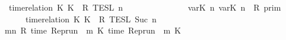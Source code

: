 \begin{isabellebody}
\ \ {\isacartoucheopen}{\isasymlbrakk}\ time{\isacharminus}relation\ {\isasymlfloor}K\ K\ {\isasymin}\ R\ {\isasymrbrakk}\isactrlsub T\isactrlsub E\isactrlsub S\isactrlsub L\isactrlbsup {\isasymge}\ n\isactrlesup \ {\isacharequal}\ \ \ \ \ \ \ \ %
\isanewline
\ \ \ \ \ {\isasymlbrakk}\ {\isasymlfloor}{\isasymtau}\isactrlsub v\isactrlsub a\isactrlsub r{\isacharparenleft}K\ n{\isacharparenright}{\isacharcomma}\ {\isasymtau}\isactrlsub v\isactrlsub a\isactrlsub r{\isacharparenleft}K\ n{\isacharparenright}{\isasymrfloor}\ {\isasymin}\ R\ {\isasymrbrakk}\isactrlsub p\isactrlsub r\isactrlsub i\isactrlsub m\isanewline
\ \ \ \ \ {\isasyminter}\ {\isasymlbrakk}\ time{\isacharminus}relation\ {\isasymlfloor}K\ K\ {\isasymin}\ R\ {\isasymrbrakk}\isactrlsub T\isactrlsub E\isactrlsub S\isactrlsub L\isactrlbsup {\isasymge}\ Suc\ n\isactrlesup {\isacartoucheclose}\isanewline
%
\isadelimproof
%
\endisadelimproof
%
\isatagproof
{}\isamarkupfalse%
\ {\isacharminus}\isanewline
\ \ \isamarkupfalse%
\ {\isacartoucheopen}{\isacharbraceleft}{\isasymrho}{\isachardot}\ {\isasymforall}m{\isasymge}n{\isachardot}\ R\ {\isacharparenleft}time\ {\isacharparenleft}{\isacharparenleft}Rep{\isacharunderscore}run\ {\isasymrho}{\isacharparenright}\ m\ K\ time\ {\isacharparenleft}{\isacharparenleft}Rep{\isacharunderscore}run\ {\isasymrho}{\isacharparenright}\ m\ K\isanewline

\end{isabellebody}
